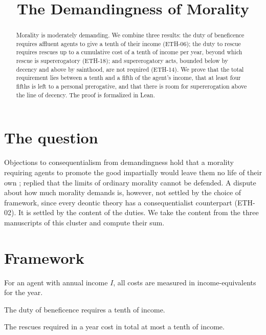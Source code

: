 \documentclass{situationist-preprint}
\title{The Demandingness of Morality}
\begin{document}
\maketitle

\begin{abstract}
Morality is moderately demanding. We combine three results: the duty of beneficence requires affluent agents to give a tenth of their income (ETH-06); the duty to rescue requires rescues up to a cumulative cost of a tenth of income per year, beyond which rescue is supererogatory (ETH-18); and supererogatory acts, bounded below by decency and above by sainthood, are not required (ETH-14). We prove that the total requirement lies between a tenth and a fifth of the agent's income, that at least four fifths is left to a personal prerogative, and that there is room for supererogation above the line of decency. The proof is formalized in Lean.
\end{abstract}

\section{The question}

Objections to consequentialism from demandingness hold that a morality requiring agents to promote the good impartially would leave them no life of their own \citep{Scheffler1982}; \citet{Kagan1989} replied that the limits of ordinary morality cannot be defended. A dispute about how much morality demands is, however, not settled by the choice of framework, since every deontic theory has a consequentialist counterpart (ETH-02). It is settled by the content of the duties. We take the content from the three manuscripts of this cluster and compute their sum.

\section{Framework}

For an agent with annual income $I$, all costs are measured in income-equivalents for the year.

\begin{assumption}\label{a:ben}
The duty of beneficence requires a tenth of income.
\end{assumption}

\begin{assumption}\label{a:res}
The rescues required in a year cost in total at most a tenth of income.
\end{assumption}
\end{document}
